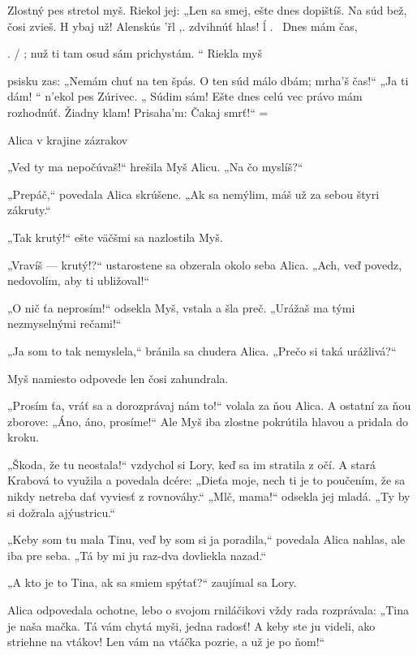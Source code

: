 \documentclass[12pt]{book}
\begin{document}
\begin{Parallel}[p]{}{}
{ 

Zlostný pes
stretol myš.
Riekol jej:
„Len sa smej,
ešte dnes
dopištíš.
Na súd bež,
čosi zvieš.
H ybaj už!
Alenskús   'řl ,.
zdvihnúť hlas! ĺ . \
Dnes mám čas,

. / ;
nuž ti tam
osud sám
prichystám. “
Riekla myš

psisku zas:
„Nemám chuť
na ten špás.
O ten súd
málo dbám;
mrha'š čas!“
„Ja ti dám! “
n'ekol pes
Zúrivec.
„ Súdim sám!
Ešte dnes
celú vec
právo mám
rozhodnúť.
Žiadny klam!
Prisaha'm:
Čakaj smrť!“ =

   

 

 

 

Alica v krajine zázrakov

„Ved ty ma nepočúvaš!“ hrešila Myš Alicu. „Na čo
myslíš?“

„Prepáč,“ povedala Alica skrúšene. „Ak sa nemýlim, máš
už za sebou štyri zákruty.“

„Tak krutý!“ ešte väčšmi sa nazlostila Myš.

„Vravíš — krutý!?“ ustarostene sa obzerala okolo seba
Alica. „Ach, veď povedz, nedovolím, aby ti ubližoval!“

„O nič ťa neprosím!“ odsekla Myš, vstala a šla preč.
„Urážaš ma tými nezmyselnými rečami!“

„Ja som to tak nemyslela,“ bránila sa chudera Alica.
„Prečo si taká urážlivá?“

Myš namiesto odpovede len čosi zahundrala.

„Prosím ťa, vráť sa a dorozprávaj nám to!“ volala za ňou
Alica. A ostatní za ňou zborove: „Áno, áno, prosíme!“ Ale
Myš iba zlostne pokrútila hlavou a pridala do kroku.

„Škoda, že tu neostala!“ vzdychol si Lory, keď sa im
stratila z očí. A stará Krabová to využila a povedala dcére:
„Dieťa moje, nech ti je to poučením, že sa nikdy netreba dať
vyviesť z rovnováhy.“ „Mlč, mama!“ odsekla jej mladá. „Ty
by si dožrala ajýustricu.“

„Keby som tu mala Tinu, veď by som si ja poradila,“
povedala Alica nahlas, ale iba pre seba. „Tá by mi ju
raz-dva dovliekla nazad.“

„A kto je to Tina, ak sa smiem spýtať?“ zaujímal sa
Lory.

Alica odpovedala ochotne, lebo o svojom rniláčikovi vždy
rada rozprávala: „Tina je naša mačka. Tá vám chytá myši,
jedna radosť! A keby ste ju videli, ako striehne na vtákov!
Len vám na vtáčka pozrie, a už je po ňom!“

}
\end{Parallel}
\end{document}
